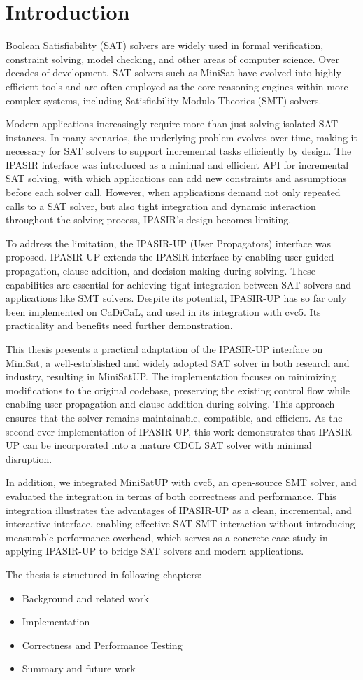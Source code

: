 \chapter{Introduction}

Boolean Satisfiability (SAT) solvers are widely used in formal verification, constraint solving, model checking, and other areas of computer science. Over decades of development, SAT solvers such as MiniSat have evolved into highly efficient tools and are often employed as the core reasoning engines within more complex systems, including Satisfiability Modulo Theories (SMT) solvers.

Modern applications increasingly require more than just solving isolated SAT instances. In many scenarios, the underlying problem evolves over time, making it necessary for SAT solvers to support incremental tasks efficiently by design. The IPASIR interface was introduced as a minimal and efficient API for incremental SAT solving, with which applications can add new constraints and assumptions before each solver call. However, when applications demand not only repeated calls to a SAT solver, but also tight integration and dynamic interaction throughout the solving process, IPASIR's design becomes limiting.

To address the limitation, the IPASIR-UP (User Propagators) interface was proposed. IPASIR-UP extends the IPASIR interface by enabling user-guided propagation, clause addition, and decision making during solving. These capabilities are essential for achieving tight integration between SAT solvers and applications like SMT solvers. Despite its potential, IPASIR-UP has so far only been implemented on CaDiCaL, and used in its integration with cvc5. Its practicality and benefits need further demonstration.

This thesis presents a practical adaptation of the IPASIR-UP interface on MiniSat, a well-established and widely adopted SAT solver in both research and industry, resulting in MiniSatUP. The implementation focuses on minimizing modifications to the original codebase, preserving the existing control flow while enabling user propagation and clause addition during solving. This approach ensures that the solver remains maintainable, compatible, and efficient. As the second ever implementation of IPASIR-UP, this work demonstrates that IPASIR-UP can be incorporated into a mature CDCL SAT solver with minimal disruption.

In addition, we integrated MiniSatUP with cvc5, an open-source SMT solver, and evaluated the integration in terms of both correctness and performance. This integration illustrates the advantages of IPASIR-UP as a clean, incremental, and interactive interface, enabling effective SAT-SMT interaction without introducing measurable performance overhead, which serves as a concrete case study in applying IPASIR-UP to bridge SAT solvers and modern applications.

The thesis is structured in following chapters:

\begin{itemize}
  \item Background and related work
  \item Implementation
  \item Correctness and Performance Testing
  \item Summary and future work
\end{itemize}
